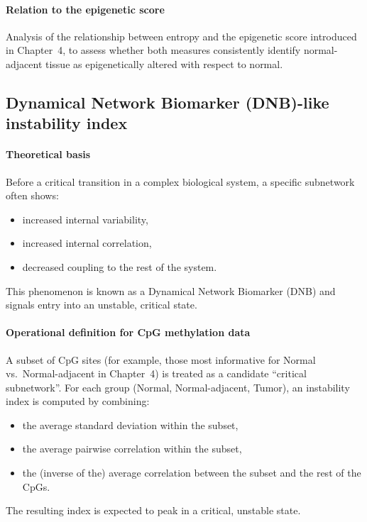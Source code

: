 \documentclass[10pt]{extarticle}
\begin{document}
\paragraph{Relation to the epigenetic score}
Analysis of the relationship between entropy and the epigenetic score introduced in Chapter~4, to assess whether both measures consistently identify normal-adjacent tissue as epigenetically altered with respect to normal.

\subsection{Dynamical Network Biomarker (DNB)-like instability index}

\paragraph{Theoretical basis}
Before a critical transition in a complex biological system, a specific subnetwork often shows:
\begin{itemize}[label=-]
    \item increased internal variability,
    \item increased internal correlation,
    \item decreased coupling to the rest of the system.
\end{itemize}
This phenomenon is known as a Dynamical Network Biomarker (DNB) and signals entry into an unstable, critical state.

\paragraph{Operational definition for CpG methylation data}
A subset of CpG sites (for example, those most informative for Normal vs.\ Normal-adjacent in Chapter~4) is treated as a candidate ``critical subnetwork''.  
For each group (Normal, Normal-adjacent, Tumor), an instability index is computed by combining:
\begin{itemize}[label=-]
    \item the average standard deviation within the subset,
    \item the average pairwise correlation within the subset,
    \item the (inverse of the) average correlation between the subset and the rest of the CpGs.
\end{itemize}
The resulting index is expected to peak in a critical, unstable state.
\end{document}
